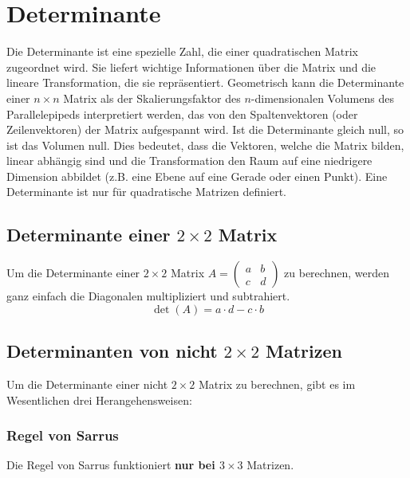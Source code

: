 \chapter{Determinante}
\label{determinante}

Die Determinante ist eine spezielle Zahl, die einer quadratischen Matrix
zugeordnet wird. Sie liefert wichtige Informationen über die Matrix und die
lineare Transformation, die sie repräsentiert. Geometrisch kann die
Determinante einer $n \times n$ Matrix als der Skalierungsfaktor des
$n$-dimensionalen Volumens des Parallelepipeds interpretiert werden, das von
den Spaltenvektoren (oder Zeilenvektoren) der Matrix aufgespannt wird. Ist die
Determinante gleich null, so ist das Volumen null. Dies bedeutet, dass die
Vektoren, welche die Matrix bilden, linear abhängig sind und die Transformation
den Raum auf eine niedrigere Dimension abbildet (z.B. eine Ebene auf eine
Gerade oder einen Punkt). Eine Determinante ist nur für quadratische Matrizen
definiert.

\section{Determinante einer $2 \times 2$ Matrix}

Um die Determinante einer $2 \times 2$ Matrix $A = \begin{pmatrix} a & b \\ c & d \end{pmatrix}$ zu berechnen, werden ganz einfach die Diagonalen multipliziert und subtrahiert.
\[
    \det(A) = a \cdot d - c \cdot b
\]

\section{Determinanten von nicht $2 \times 2$ Matrizen}

Um die Determinante einer nicht $2 \times 2$ Matrix zu berechnen, gibt es im
Wesentlichen drei Herangehensweisen:

\subsection{Regel von Sarrus}

Die Regel von Sarrus funktioniert \textbf{nur bei $3 \times 3$} Matrizen.

